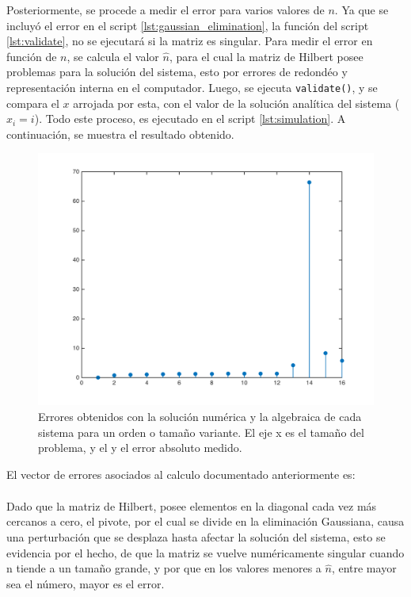 \documentclass[11pt, spanish]{article}
\begin{document}
\begin{enumerate}
Posteriormente, se procede a medir el error para varios valores de $n$. Ya que se incluyó el error en el script \ref{lst:gaussian_elimination}, la función del script \ref{lst:validate}, no se ejecutará si la matriz es singular. Para medir el error en función de $n$, se calcula el valor $\hat{n}$, para el cual la matriz de Hilbert posee problemas para la solución del sistema, esto por errores de redondéo y representación interna en el computador. Luego, se ejecuta \texttt{validate()}, y se compara el $x$ arrojada por esta, con el valor de la solución analítica del sistema ($x_i = i$). Todo este proceso, es ejecutado en el script \ref{lst:simulation}. A continuación, se muestra el resultado obtenido.

\begin{figure}[htbp]
\centering
	\includegraphics[scale=0.55]{data/img/error}
	\caption{Errores obtenidos con la solución numérica y la algebraica de cada sistema para un orden o tamaño variante. El eje x es el tamaño del problema, y el y el error absoluto medido.}
\end{figure}

El vector de errores asociados al calculo documentado anteriormente es:
\begin{align*}
[0,\ 0.75899,\ 0.98478,\ 1.10780,\ 1.18572,\ 1.23971,\ 1.27945,\ 1.31001,\\ 1.33430,\ 1.35410,\ 1.37060,\ 1.38667,\ 4.21665,\ 66.47713,\ 8.28886,\ 5.75513]
\end{align*}

Dado que la matriz de Hilbert, posee elementos en la diagonal cada vez más cercanos a cero, el pivote, por el cual se divide en la eliminación Gaussiana, causa una perturbación que se desplaza hasta afectar la solución del sistema, esto se evidencia por el hecho, de que la matriz se vuelve numéricamente singular cuando n tiende a un tamaño grande, y por que en los valores menores a $\hat{n}$, entre mayor sea el número, mayor es el error.


\end{enumerate}
\end{document}
